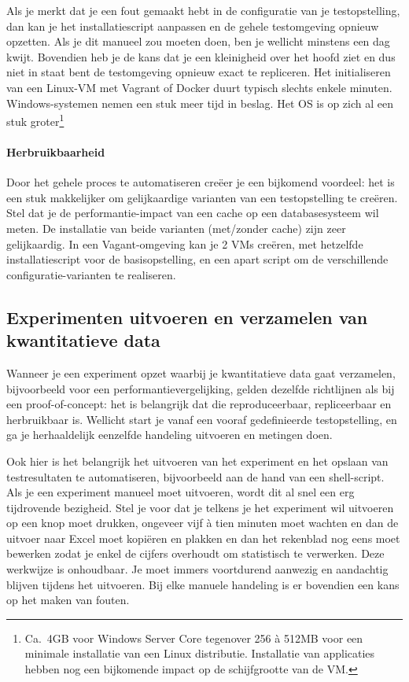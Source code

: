 Als je merkt dat je een fout gemaakt hebt in de configuratie van je testopstelling, dan kan je het installatiescript aanpassen en de gehele testomgeving opnieuw opzetten. Als je dit manueel zou moeten doen, ben je wellicht minstens een dag kwijt. Bovendien heb je de kans dat je een kleinigheid over het hoofd ziet en dus niet in staat bent de testomgeving opnieuw exact te repliceren. Het initialiseren van een Linux-VM met Vagrant of Docker duurt typisch slechts enkele minuten. Windows-systemen nemen een stuk meer tijd in beslag. Het OS is op zich al een stuk groter\footnote{Ca.~4GB voor Windows Server Core tegenover 256 à 512MB voor een minimale installatie van een Linux distributie. Installatie van applicaties hebben nog een bijkomende impact op de schijfgrootte van de VM.}

\paragraph{Herbruikbaarheid}%

Door het gehele proces te automatiseren creëer je een bijkomend voordeel: het is een stuk makkelijker om gelijkaardige varianten van een testopstelling te creëren. Stel dat je de performantie-impact van een cache op een databasesysteem wil meten. De installatie van beide varianten (met/zonder cache) zijn zeer gelijkaardig. In een Vagant-omgeving kan je 2 VMs creëren, met hetzelfde installatiescript voor de basisopstelling, en een apart script om de verschillende configuratie-varianten te realiseren.

\subsection{Experimenten uitvoeren en verzamelen van kwantitatieve data}%
\label{ssec:experimenten-uitvoeren}

Wanneer je een experiment opzet waarbij je kwantitatieve data gaat verzamelen, bijvoorbeeld voor een performantievergelijking, gelden dezelfde richtlijnen als bij een proof-of-concept: het is belangrijk dat die reproduceerbaar, repliceerbaar en herbruikbaar is. Wellicht start je vanaf een vooraf gedefinieerde testopstelling, en ga je herhaaldelijk eenzelfde handeling uitvoeren en metingen doen.

Ook hier is het belangrijk het uitvoeren van het experiment en het opslaan van testresultaten te automatiseren, bijvoorbeeld aan de hand van een shell-script. Als je een experiment manueel moet uitvoeren, wordt dit al snel een erg tijdrovende bezigheid. Stel je voor dat je telkens je het experiment wil uitvoeren op een knop moet drukken, ongeveer vijf à tien minuten moet wachten en dan de uitvoer naar Excel moet kopiëren en plakken en dan het rekenblad nog eens moet bewerken zodat je enkel de cijfers overhoudt om statistisch te verwerken. Deze werkwijze is onhoudbaar. Je moet immers voortdurend aanwezig en aandachtig blijven tijdens het uitvoeren. Bij elke manuele handeling is er bovendien een kans op het maken van fouten.

